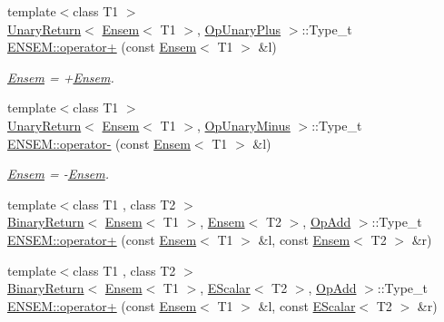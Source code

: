 \begin{DoxyCompactItemize}
{\footnotesize template$<$class T1 $>$ }\\\mbox{\hyperlink{structENSEM_1_1UnaryReturn}{Unary\+Return}}$<$ \mbox{\hyperlink{classENSEM_1_1Ensem}{Ensem}}$<$ T1 $>$, \mbox{\hyperlink{structENSEM_1_1OpUnaryPlus}{Op\+Unary\+Plus}} $>$\+::Type\+\_\+t \mbox{\hyperlink{group__eensem_ga777c950dac5bc271c641c0f086f44ebf}{E\+N\+S\+E\+M\+::operator+}} (const \mbox{\hyperlink{classENSEM_1_1Ensem}{Ensem}}$<$ T1 $>$ \&l)
\begin{DoxyCompactList}\small\item\em \mbox{\hyperlink{classENSEM_1_1Ensem}{Ensem}} = +\mbox{\hyperlink{classENSEM_1_1Ensem}{Ensem}}. \end{DoxyCompactList}\item 
{\footnotesize template$<$class T1 $>$ }\\\mbox{\hyperlink{structENSEM_1_1UnaryReturn}{Unary\+Return}}$<$ \mbox{\hyperlink{classENSEM_1_1Ensem}{Ensem}}$<$ T1 $>$, \mbox{\hyperlink{structENSEM_1_1OpUnaryMinus}{Op\+Unary\+Minus}} $>$\+::Type\+\_\+t \mbox{\hyperlink{group__eensem_ga401760b4a9588007075073995611fa86}{E\+N\+S\+E\+M\+::operator-\/}} (const \mbox{\hyperlink{classENSEM_1_1Ensem}{Ensem}}$<$ T1 $>$ \&l)
\begin{DoxyCompactList}\small\item\em \mbox{\hyperlink{classENSEM_1_1Ensem}{Ensem}} = -\/\mbox{\hyperlink{classENSEM_1_1Ensem}{Ensem}}. \end{DoxyCompactList}\item 
{\footnotesize template$<$class T1 , class T2 $>$ }\\\mbox{\hyperlink{structENSEM_1_1BinaryReturn}{Binary\+Return}}$<$ \mbox{\hyperlink{classENSEM_1_1Ensem}{Ensem}}$<$ T1 $>$, \mbox{\hyperlink{classENSEM_1_1Ensem}{Ensem}}$<$ T2 $>$, \mbox{\hyperlink{structENSEM_1_1OpAdd}{Op\+Add}} $>$\+::Type\+\_\+t \mbox{\hyperlink{group__eensem_ga724a1c256d14ef567ac649b0ae8df485}{E\+N\+S\+E\+M\+::operator+}} (const \mbox{\hyperlink{classENSEM_1_1Ensem}{Ensem}}$<$ T1 $>$ \&l, const \mbox{\hyperlink{classENSEM_1_1Ensem}{Ensem}}$<$ T2 $>$ \&r)
\item 
{\footnotesize template$<$class T1 , class T2 $>$ }\\\mbox{\hyperlink{structENSEM_1_1BinaryReturn}{Binary\+Return}}$<$ \mbox{\hyperlink{classENSEM_1_1Ensem}{Ensem}}$<$ T1 $>$, \mbox{\hyperlink{classENSEM_1_1EScalar}{E\+Scalar}}$<$ T2 $>$, \mbox{\hyperlink{structENSEM_1_1OpAdd}{Op\+Add}} $>$\+::Type\+\_\+t \mbox{\hyperlink{group__eensem_ga370913e6f39a2b7be0ce0b78f156978a}{E\+N\+S\+E\+M\+::operator+}} (const \mbox{\hyperlink{classENSEM_1_1Ensem}{Ensem}}$<$ T1 $>$ \&l, const \mbox{\hyperlink{classENSEM_1_1EScalar}{E\+Scalar}}$<$ T2 $>$ \&r)

\end{DoxyCompactItemize}
